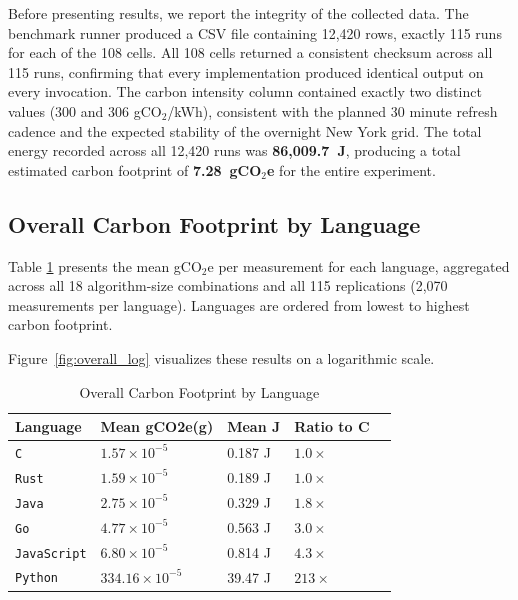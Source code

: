 Before presenting results, we report the integrity of the collected data. The benchmark runner produced a CSV file containing 12,420 rows, exactly 115 runs for each of the 108 cells. All 108 cells returned a consistent checksum across all 115 runs, confirming that every implementation produced identical output on every invocation. The carbon intensity column contained exactly two distinct values (300 and 306 gCO$_2$/kWh), consistent with the planned 30 minute refresh cadence and the expected stability of the overnight New York grid. The total energy recorded across all 12,420 runs was \textbf{86,009.7~J}, producing a total estimated carbon footprint of \textbf{7.28~gCO$_2$e} for the entire experiment.



\subsection{Overall Carbon Footprint by Language}
Table \ref{tab:overall_gco2e} presents the mean  gCO$_2$e per measurement for each language, aggregated across all 18 algorithm-size combinations and all 115 replications (2,070 measurements per language). Languages are ordered from lowest to highest carbon footprint.

Figure~\ref{fig:overall_log} visualizes these results on a logarithmic scale.

\begin{table}[h]
    \centering
    \caption{Overall Carbon Footprint by Language}\label{tab:overall_gco2e}
    \small
    \begin{tabular}{lllll}
        \hline
        \textbf{Language} & \textbf{Mean gCO2e(g)} & \textbf{Mean J} & \textbf{Ratio to C}   \\
        \hline
            \texttt{C}              & $1.57 \times 10^{-5}$       & 0.187 J   &  $1.0\times$    \\
            \texttt{Rust}           & $1.59 \times 10^{-5}$       & 0.189 J   &  $1.0\times$    \\
            \texttt{Java}           & $2.75 \times 10^{-5}$       & 0.329 J   &  $1.8\times$    \\
            \texttt{Go}             & $4.77 \times 10^{-5}$       & 0.563 J   &  $3.0\times$    \\
            \texttt{JavaScript}     & $6.80 \times 10^{-5}$       & 0.814 J   &  $4.3\times$    \\
            \texttt{Python}         & $334.16 \times 10^{-5}$       & 39.47 J   &  $213\times$          \\
        \hline
    \end{tabular}
\end{table}

